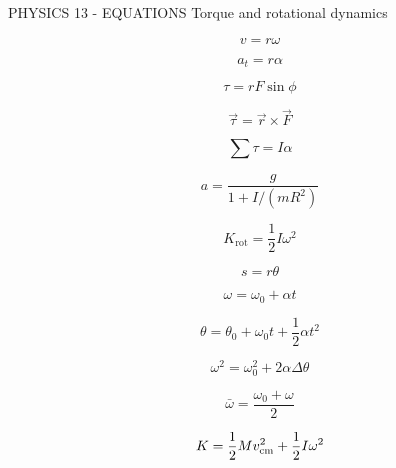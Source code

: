 PHYSICS 13 - EQUATIONS
Torque and rotational dynamics

$$v = r\omega$$

$$a_t = r\alpha$$

$$\tau = rF\sin\phi$$

$$\vec\tau = \vec r\times\vec F$$

$$\sum\tau = I\alpha$$

$$a = \frac{g}{1 + I/(mR^2)}$$

$$K_{\text{rot}} = \frac12 I\omega^2$$


$$s=r\theta$$

$$\omega=\omega_0+\alpha t$$

$$\theta=\theta_0+\omega_0t+\frac12\alpha t^2$$

$$\omega^2=\omega_0^2+2\alpha\Delta\theta$$

$$\bar\omega=\frac{\omega_0+\omega}{2}$$

$$K=\frac12 Mv_{\rm cm}^2+\frac12I\omega^2$$
